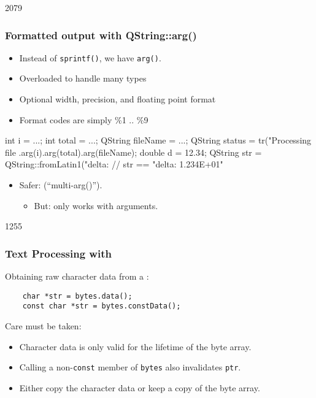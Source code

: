 \begin{slide}[fragile]{2079}
\frametitle{Formatted output with QString::arg()}
\begin{itemize}
\item Instead of \texttt{sprintf()}, we have \texttt{arg()}.
\item Overloaded to handle many types
\item Optional width, precision, and floating point format 
\item Format codes are simply \%1 .. \%9
\end{itemize}
\begin{cpp}
     int i = ...;
     int total = ...;
     QString fileName = ...;
     QString status = tr("Processing file %
                     .arg(i).arg(total).arg(fileName);
     double d = 12.34;
     QString str = QString::fromLatin1("delta: %
     // str == "delta: 1.234E+01"               
\end{cpp}
\begin{itemize}
\item Safer:  (``multi-arg()'').
  \begin{itemize}
  \item But: only works with  arguments.
  \end{itemize}
\end{itemize}
\end{slide}

\begin{slide}[fragile]{1255}\frametitle{Text Processing with }
  Obtaining raw character data from a :
  
  \begin{lstlisting}
    char *str = bytes.data();
    const char *str = bytes.constData();
  \end{lstlisting}
  
  Care must be taken:
  \begin{itemize}
  \item Character data is only valid for the lifetime of the byte array.
  \item Calling a non-\texttt{const} member of \texttt{bytes} also invalidates \texttt{ptr}.
  \item Either copy the character data or keep a copy of the byte array.
  \end{itemize}
\end{slide}


